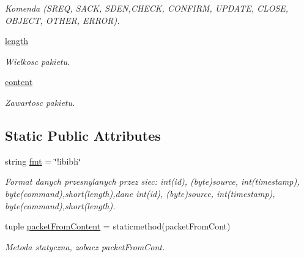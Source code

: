 \begin{CompactItemize}
\begin{CompactList}\small\item\em Komenda (SREQ, SACK, SDEN,CHECK, CONFIRM, UPDATE, CLOSE, OBJECT, OTHER, ERROR). \item\end{CompactList}\item 
\hypertarget{class_serv_1_1_packet_1_1_packet_df68d3f40f5a7583fce563366f2f9e61}{
\hyperlink{class_serv_1_1_packet_1_1_packet_df68d3f40f5a7583fce563366f2f9e61}{length}}
\label{class_serv_1_1_packet_1_1_packet_df68d3f40f5a7583fce563366f2f9e61}

\begin{CompactList}\small\item\em Wielkosc pakietu. \item\end{CompactList}\item 
\hypertarget{class_serv_1_1_packet_1_1_packet_24efe22ef361ee7d966a663e96241820}{
\hyperlink{class_serv_1_1_packet_1_1_packet_24efe22ef361ee7d966a663e96241820}{content}}
\label{class_serv_1_1_packet_1_1_packet_24efe22ef361ee7d966a663e96241820}

\begin{CompactList}\small\item\em Zawartosc pakietu. \item\end{CompactList}\end{CompactItemize}
\subsection*{Static Public Attributes}
\begin{CompactItemize}
\item 
\hypertarget{class_serv_1_1_packet_1_1_packet_0406f36f89d9da4feb94f31959367ce8}{
string \hyperlink{class_serv_1_1_packet_1_1_packet_0406f36f89d9da4feb94f31959367ce8}{fmt} = \char`\"{}!ibibh\char`\"{}}
\label{class_serv_1_1_packet_1_1_packet_0406f36f89d9da4feb94f31959367ce8}

\begin{CompactList}\small\item\em Format danych przesnylanych przez siec: int(id), (byte)source, int(timestamp), byte(command),short(length),dane int(id), (byte)source, int(timestamp), byte(command),short(length). \item\end{CompactList}\item 
\hypertarget{class_serv_1_1_packet_1_1_packet_145ac89df7bc66728e8b3e642650aff4}{
tuple \hyperlink{class_serv_1_1_packet_1_1_packet_145ac89df7bc66728e8b3e642650aff4}{packetFromContent} = staticmethod(packetFromCont)}
\label{class_serv_1_1_packet_1_1_packet_145ac89df7bc66728e8b3e642650aff4}

\begin{CompactList}\small\item\em Metoda statyczna, zobacz packetFromCont. \item\end{CompactList}\end{CompactItemize}


